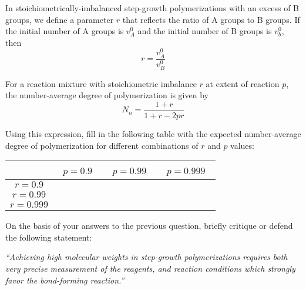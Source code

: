 \begin{activity}
\begin{ctqs}
\end{ctqs}
	
\begin{infobox}

In stoichiometrically-imbalanced step-growth polymerizations with an excess of B groups, we define a parameter $r$ that reflects the ratio of A groups to B groups.	
	If the initial number of A groups is $v_A^0$ and the initial number of B groups is $v_b^0$, then
	\begin{equation*}
		r = \frac{v_A^0}{v_B^0}
	\end{equation*}
	
	
	For a reaction mixture with stoichiometric imbalance $r$ at extent of reaction $p$, the number-average degree of polymerization is given by
	\begin{equation*}
		N_n = \frac{1+r}{1+r-2pr}
	\end{equation*}
	
\end{infobox}
	
\begin{ctqs}
		\question Using this expression, fill in the following table with the expected number-average degree of polymerization for different combinations of $r$ and $p$ values:
		
			\begin{table}[!h]
				\centering
				\renewcommand{\arraystretch}{3}
				\begin{tabular}{|c|c|c|c|}
					\hline
					 &  ~$p=0.9$~ & ~$p=0.99$~ & ~$p=0.999$~ \\\hline
					$r=0.9$ &&& \\\hline
					$r=0.99$ &&& \\\hline
					$r=0.999$ &&& \\\hline
				\end{tabular}
			\end{table}
		
		\question On the basis of your answers to the previous question, briefly critique or defend the following statement:
		
			\emph{``Achieving high molecular weights in step-growth polymerizations requires both very precise measurement of the reagents, and reaction conditions which strongly favor the bond-forming reaction.''}
			
\end{ctqs}


\end{activity}

